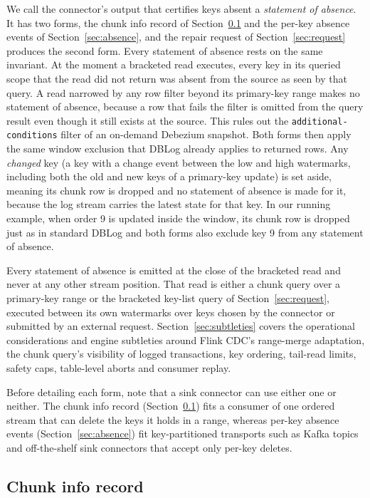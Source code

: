 \documentclass[sigconf,nonacm,10pt]{acmart}
\begin{document}
We call the connector's output that certifies keys absent a \emph{statement of
absence}. It has two forms, the chunk info record of Section~\ref{sec:chunkinfo}
and the per-key absence events of Section~\ref{sec:absence}, and the repair
request of Section~\ref{sec:request} produces the second form. Every statement
of absence rests on the same invariant. At the moment a bracketed read executes,
every key in its queried scope that the read did not return was absent from the
source as seen by that query. A read narrowed by any row filter beyond its primary-key
range makes no statement of absence, because a row that fails the filter is
omitted from the query result even though it still exists at the source. This
rules out the \texttt{additional-conditions} filter of an on-demand Debezium
snapshot. Both forms then apply the same window exclusion that DBLog
already applies to returned rows. Any
\emph{changed} key (a key with a change event between the low and high
watermarks, including both the old and new keys of a primary-key update) is set aside, meaning its chunk row is dropped and
no statement of absence is made for it, because the log stream carries the latest state for that key. In our running example, 
when order 9 is updated inside the window, its chunk row is dropped just as in standard DBLog and both forms also exclude key 9 
from any statement of absence.

Every statement of absence is emitted at the close of the bracketed read and never at any other stream position. That read is either a
chunk query over a primary-key range or the bracketed key-list query of
Section~\ref{sec:request}, executed between its own watermarks over keys chosen
by the connector or submitted by an external request.
Section~\ref{sec:subtleties} covers the operational considerations and engine
subtleties around Flink CDC's range-merge adaptation, the chunk query's
visibility of logged transactions, key ordering, tail-read limits, safety
caps, table-level aborts and consumer replay.

Before detailing each form, note that a sink connector can use either one or
neither. The chunk info record (Section~\ref{sec:chunkinfo}) fits a consumer of
one ordered stream that can delete the keys it holds in a range, whereas
per-key absence events (Section~\ref{sec:absence}) fit key-partitioned
transports such as Kafka topics and off-the-shelf sink connectors that accept
only per-key deletes.

\subsection{Chunk info record}\label{sec:chunkinfo}
\end{document}
